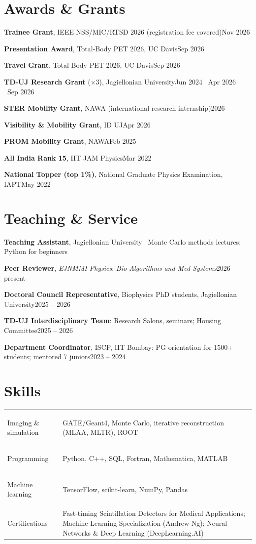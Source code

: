 \documentclass[10.5pt,a4paper]{article}
\newcommand{\row}[2]{\noindent #1\hfill{\small\color{mute}#2}\par\vspace{2.5pt}}
\begin{document}
\section{Awards \& Grants}
\row{\textbf{Trainee Grant}, IEEE NSS/MIC/RTSD 2026 (registration fee covered)}{Nov 2026}
\row{\textbf{Presentation Award}, Total-Body PET 2026, UC Davis}{Sep 2026}
\row{\textbf{Travel Grant}, Total-Body PET 2026, UC Davis}{Sep 2026}
\row{\textbf{TD-UJ Research Grant} (\(\times\)3), Jagiellonian University}{Jun 2024 \textbullet\ Apr 2026 \textbullet\ Sep 2026}
\row{\textbf{STER Mobility Grant}, NAWA (international research internship)}{2026}
\row{\textbf{Visibility \& Mobility Grant}, ID UJ}{Apr 2026}
\row{\textbf{PROM Mobility Grant}, NAWA}{Feb 2025}
\row{\textbf{All India Rank 15}, IIT JAM Physics}{Mar 2022}
\row{\textbf{National Topper (top 1\%)}, National Graduate Physics Examination, IAPT}{May 2022}

\section{Teaching \& Service}
\row{\textbf{Teaching Assistant}, Jagiellonian University \textendash\ Monte Carlo methods lectures; Python for beginners}{}
\row{\textbf{Peer Reviewer}, \emph{EJNMMI Physics}; \emph{Bio-Algorithms and Med-Systems}}{2026 -- present}
\row{\textbf{Doctoral Council Representative}, Biophysics PhD students, Jagiellonian University}{2025 -- 2026}
\row{\textbf{TD-UJ Interdisciplinary Team}: Research Salons, seminars; Housing Committee}{2025 -- 2026}
\row{\textbf{Department Coordinator}, ISCP, IIT Bombay: PG orientation for 1500+ students; mentored 7 juniors}{2023 -- 2024}

\section{Skills}
\begin{tabularx}{\textwidth}{@{}>{\bfseries\raggedright\arraybackslash}p{4.1cm}X@{}}
Imaging \& simulation & GATE/Geant4, Monte Carlo, iterative reconstruction (MLAA, MLTR), ROOT\\
Programming & Python, C++, SQL, Fortran, Mathematica, MATLAB\\
Machine learning & TensorFlow, scikit-learn, NumPy, Pandas\\
Certifications & Fast-timing Scintillation Detectors for Medical Applications; Machine Learning Specialization (Andrew Ng); Neural Networks \& Deep Learning (DeepLearning.AI)\\
\end{tabularx}
\end{document}
